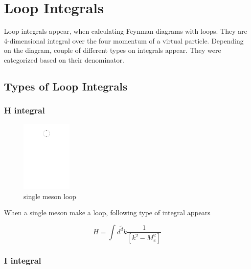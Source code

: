 \documentclass{article}
\newcommand{\beq}{\begin{equation}}
\newcommand{\eeq}{\end{equation}}
\begin{document}
\newpage
\section{Loop Integrals}


Loop integrals appear, when calculating Feynman diagrams with loops. They are 4-dimensional integral over the four momentum of a virtual particle. Depending on the diagram, couple of different types on integrals appear. They were categorized based on their denominator.

\subsection{Types of Loop Integrals}

\subsubsection{H integral}

\begin{figure}[h]
\caption{single meson loop}
\includegraphics[trim={7cm 23cm 9cm 2cm}, clip=true,width=  2.5cm]{images/types of loops/meson.pdf}
\centering
\end{figure}

When a single meson make a loop, following type of integral appears

\beq
H = \int \tilde{d^dk} \frac{   {1}    }{  \left[k^2-M_\pi^2 \right] } 
\eeq   

\subsubsection{I integral}
\end{document}
